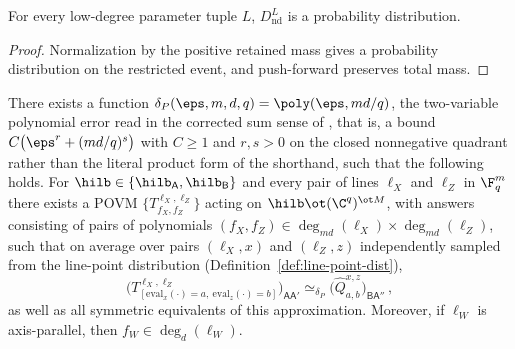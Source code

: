 \begin{theorem}
	\label{thm:nondegenerate-line-pasting-dist-probability}
	\leanok
	For every low-degree parameter tuple $L$, $D_{\mathrm{nd}}^L$ is a
	probability distribution.
\end{theorem}
\begin{proof}
	\leanok
	Normalization by the positive retained mass gives a probability
	distribution on the restricted event, and push-forward preserves total mass.
\end{proof}

\begin{lemma}
	\label{lem:qld-xz-lines}
	\notready
	There exists a function $\delta_P(\eps,m,d,q) = \poly(\eps, md/q)$, the
	two-variable polynomial error read in the corrected sum sense of
	\cite{gap:qpbt_pasting-product-error}, that is, a bound
	$C\bigl(\eps^{r} + (md/q)^{s}\bigr)$ with $C \ge 1$ and $r, s > 0$ on the
	closed nonnegative quadrant rather than the literal product form of the
	shorthand, such that the following holds. For
	$\hilb \in \{\hilb_{\mathsf{A}}, \hilb_{\mathsf{B}}\}$ and every pair of
	lines $\ell_X$ and $\ell_Z$ in $\F_q^m$ there exists a POVM
	$\{T^{\ell_X,\ell_Z}_{f_X,f_Z}\}$ acting on $\hilb \ot (\C^q)^{\ot M}$,
	with answers consisting of pairs of polynomials
	$(f_X, f_Z) \in \deg_{md}(\ell_X) \times \deg_{md}(\ell_Z)$, such that on
	average over pairs $(\ell_X, x)$ and $(\ell_Z, z)$ independently sampled
	from the line-point distribution
	(Definition~\ref{def:line-point-dist}),
	\[
		\big(T^{\ell_X,\ell_Z}
		_{[\mathrm{eval}_x(\cdot)=a,\ \mathrm{eval}_z(\cdot)=b]}
		\big)_{\mathsf{A}\mathsf{A}'}
		\simeq_{\delta_P}
		\big(\hat{Q}^{x,z}_{a,b}\big)_{\mathsf{B}\mathsf{A}''}\,,
	\]
	as well as all symmetric equivalents of this approximation. Moreover, if
	$\ell_W$ is axis-parallel, then $f_W \in \deg_{d}(\ell_W)$.
\end{lemma}
